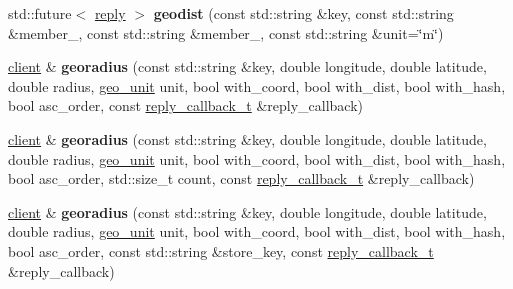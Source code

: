 \begin{DoxyCompactItemize}
\item 
\mbox{\label{classcpp__redis_1_1client_a32c21dc5c2b8187c33e22e695c2f1555}} 
std\+::future$<$ \hyperlink{classcpp__redis_1_1reply}{reply} $>$ {\bfseries geodist} (const std\+::string \&key, const std\+::string \&member\+\_, const std\+::string \&member\+\_, const std\+::string \&unit=\char`\"{}m\char`\"{})
\item 
\mbox{\label{classcpp__redis_1_1client_a34a5bcb40fc9d094f540ca85adc9b6c2}} 
\hyperlink{classcpp__redis_1_1client}{client} \& {\bfseries georadius} (const std\+::string \&key, double longitude, double latitude, double radius, \hyperlink{classcpp__redis_1_1client_aa5998536fd32ff4387c89be514997620}{geo\+\_\+unit} unit, bool with\+\_\+coord, bool with\+\_\+dist, bool with\+\_\+hash, bool asc\+\_\+order, const \hyperlink{classcpp__redis_1_1client_a061a1140d36d2eaeda82b09a0bb3f9f2}{reply\+\_\+callback\+\_\+t} \&reply\+\_\+callback)
\item 
\mbox{\label{classcpp__redis_1_1client_a4e2dc000f6f89c08119500b4764f3db6}} 
\hyperlink{classcpp__redis_1_1client}{client} \& {\bfseries georadius} (const std\+::string \&key, double longitude, double latitude, double radius, \hyperlink{classcpp__redis_1_1client_aa5998536fd32ff4387c89be514997620}{geo\+\_\+unit} unit, bool with\+\_\+coord, bool with\+\_\+dist, bool with\+\_\+hash, bool asc\+\_\+order, std\+::size\+\_\+t count, const \hyperlink{classcpp__redis_1_1client_a061a1140d36d2eaeda82b09a0bb3f9f2}{reply\+\_\+callback\+\_\+t} \&reply\+\_\+callback)
\item 
\mbox{\label{classcpp__redis_1_1client_a056cb00941824bb8d20afd9172f76546}} 
\hyperlink{classcpp__redis_1_1client}{client} \& {\bfseries georadius} (const std\+::string \&key, double longitude, double latitude, double radius, \hyperlink{classcpp__redis_1_1client_aa5998536fd32ff4387c89be514997620}{geo\+\_\+unit} unit, bool with\+\_\+coord, bool with\+\_\+dist, bool with\+\_\+hash, bool asc\+\_\+order, const std\+::string \&store\+\_\+key, const \hyperlink{classcpp__redis_1_1client_a061a1140d36d2eaeda82b09a0bb3f9f2}{reply\+\_\+callback\+\_\+t} \&reply\+\_\+callback)
\item 
\mbox{\label{classcpp__redis_1_1client_a5f5cf736292940d88533b2d305ebc670}} 

\end{DoxyCompactItemize}
